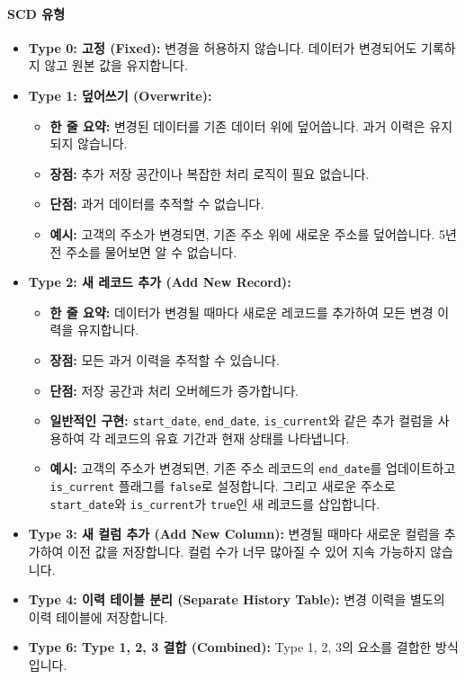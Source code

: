 \documentclass[11pt,a4paper]{article}
\theoremstyle{definition}
\begin{document}
\paragraph{SCD 유형}
\begin{itemize}
    \item \textbf{Type 0: 고정 (Fixed):} 변경을 허용하지 않습니다. 데이터가 변경되어도 기록하지 않고 원본 값을 유지합니다.
    \item \textbf{Type 1: 덮어쓰기 (Overwrite):}
    \begin{itemize}
        \item \textbf{한 줄 요약:} 변경된 데이터를 기존 데이터 위에 덮어씁니다. 과거 이력은 유지되지 않습니다.
        \item \textbf{장점:} 추가 저장 공간이나 복잡한 처리 로직이 필요 없습니다.
        \item \textbf{단점:} 과거 데이터를 추적할 수 없습니다.
        \item \textbf{예시:} 고객의 주소가 변경되면, 기존 주소 위에 새로운 주소를 덮어씁니다. 5년 전 주소를 물어보면 알 수 없습니다.
    \end{itemize}
    \item \textbf{Type 2: 새 레코드 추가 (Add New Record):}
    \begin{itemize}
        \item \textbf{한 줄 요약:} 데이터가 변경될 때마다 새로운 레코드를 추가하여 모든 변경 이력을 유지합니다.
        \item \textbf{장점:} 모든 과거 이력을 추적할 수 있습니다.
        \item \textbf{단점:} 저장 공간과 처리 오버헤드가 증가합니다.
        \item \textbf{일반적인 구현:} \texttt{start_date}, \texttt{end_date}, \texttt{is_current}와 같은 추가 컬럼을 사용하여 각 레코드의 유효 기간과 현재 상태를 나타냅니다.
        \item \textbf{예시:} 고객의 주소가 변경되면, 기존 주소 레코드의 \texttt{end_date}를 업데이트하고 \texttt{is_current} 플래그를 \texttt{false}로 설정합니다. 그리고 새로운 주소로 \texttt{start_date}와 \texttt{is_current}가 \texttt{true}인 새 레코드를 삽입합니다.
    \end{itemize}
    \item \textbf{Type 3: 새 컬럼 추가 (Add New Column):} 변경될 때마다 새로운 컬럼을 추가하여 이전 값을 저장합니다. 컬럼 수가 너무 많아질 수 있어 지속 가능하지 않습니다.
    \item \textbf{Type 4: 이력 테이블 분리 (Separate History Table):} 변경 이력을 별도의 이력 테이블에 저장합니다.
    \item \textbf{Type 6: Type 1, 2, 3 결합 (Combined):} Type 1, 2, 3의 요소를 결합한 방식입니다.
\end{itemize}
\end{document}
